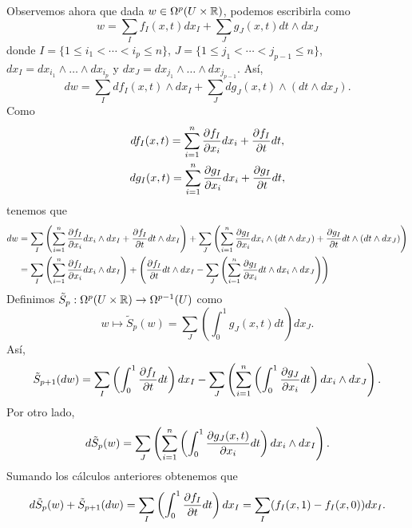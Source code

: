 \documentclass[CV.tex]{subfiles}
\begin{document}
\begin{dem}
Observemos ahora que dada $w\in\Omega^p(U\times\mathbb{R})$, podemos escribirla como 
\[
w=\sum_If_I(x,t)dx_I+\sum_Jg_J(x,t)dt\land dx_J
\]
donde $I=\{1\leq i_1<\cdots<i_p\leq n\}$, $J=\{1\leq j_1<\cdots<j_{p-1}\leq n\}$, $dx_I=dx_{i_1}\land\dots\land dx_{i_p}$ y $dx_J=dx_{j_1}\land\dots\land dx_{j_{p-1}}$. Así,
\[
dw=\sum_Idf_I(x,t)\land dx_I+\sum_J dg_J(x,t)\land (dt\land dx_J).
\]
Como
\begin{gather*}
df_I(x,t)=\sum_{i=1}^n\frac{\partial f_I}{\partial x_i}dx_i+\frac{\partial f_I}{\partial t}dt,\\
dg_I(x,t)=\sum_{i=1}^n\frac{\partial g_I}{\partial x_i}dx_i+\frac{\partial g_I}{\partial t}dt,
\end{gather*}
tenemos que 
\begin{align*}
dw&=\sum_I\left(\sum_{i=1}^n\frac{\partial f_I}{\partial x_i}dx_i\land dx_I+\frac{\partial f_I}{\partial t}dt\land dx_I\right)+ \sum_J\left(\sum_{i=1}^n\frac{\partial g_I}{\partial x_i}dx_i\land (dt\land dx_J)+\frac{\partial g_I}{\partial t}dt\land (dt\land dx_J)\right)\\
&=\sum_I\left(\sum_{i=1}^n\frac{\partial f_I}{\partial x_i}dx_i\land dx_I\right)+\left(\frac{\partial f_I}{\partial t}dt\land dx_I-\sum_J\left(\sum_{i=1}^n\frac{\partial g_I}{\partial x_i}dt\land dx_i\land dx_J\right)\right)
\end{align*}
Definimos $\tilde{S}_p:\Omega^p(U\times\mathbb{R})\to\Omega^{p-1}(U)$ como
\[
w\mapsto \tilde{S}_p(w)=\sum_J\left(\int_0^1 g_J(x,t)dt\right)dx_J.
\]
Así, 
\[
\tilde{S}_{p+1}(dw)=\sum_I\left(\int_0^1\frac{\partial f_I}{\partial t}dt\right)dx_I-\sum_J\left(\sum_{i=1}^n\left(\int_0^1\frac{\partial g_J}{\partial x_i}dt\right)dx_i\land dx_J\right).
\]
Por otro lado, 
\[
d\tilde{S}_p(w)=\sum_J\left(\sum_{i=1}^n\left(\int_0^1\frac{\partial g_J(x,t)}{\partial x_i}dt\right)dx_i\land dx_I\right).
\]
Sumando los cálculos anteriores obtenemos que
\[
d\tilde{S}_ p(w)+\tilde{S}_{p+1}(dw)=\sum_I\left(\int_0^1\frac{\partial f_I}{\partial t}dt\right)dx_I=\sum_I(f_I(x,1)-f_I(x,0))dx_I.
\]


\end{dem}
\end{document}
